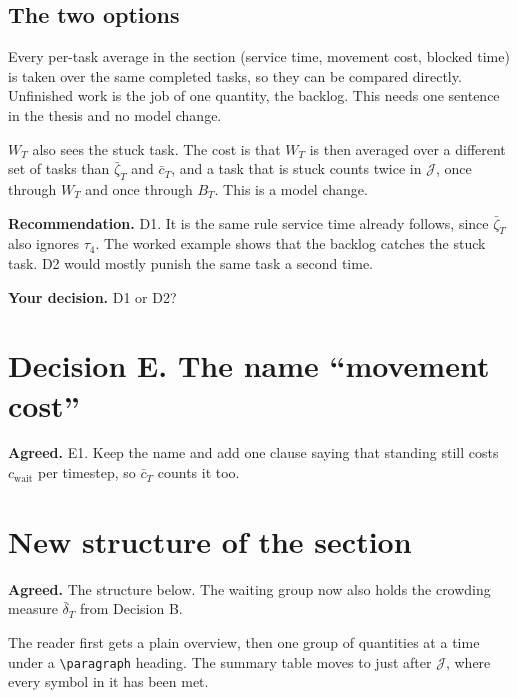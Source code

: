 \documentclass[11pt,a4paper]{article}
\newcommand{\idea}[1]{\par\smallskip\noindent\colorbox{boxbg}{\parbox{\dimexpr\linewidth-2\fboxsep}{\textbf{Recommendation.} #1}}\par\smallskip}
\newcommand{\agreed}[1]{\par\smallskip\noindent\colorbox{okbg}{\parbox{\dimexpr\linewidth-2\fboxsep}{\textbf{Agreed.} #1}}\par\smallskip}
\newcommand{\ask}[1]{\par\smallskip\noindent\colorbox{askbg}{\parbox{\dimexpr\linewidth-2\fboxsep}{\textbf{Your decision.} #1}}\par\smallskip}
\begin{document}
\subsection{The two options}

\begin{description}[leftmargin=1.5em]
  \item[D1. Keep $W_T$ as it is, and say why.] Every per-task average in
    the section (service time, movement cost, blocked time) is taken over
    the same completed tasks, so they can be compared directly. Unfinished
    work is the job of one quantity, the backlog. This needs one sentence
    in the thesis and no model change.
  \item[D2. Count every assigned task.] $W_T$ also sees the stuck task.
    The cost is that $W_T$ is then averaged over a different set of tasks
    than $\bar\zeta_T$ and $\bar c_T$, and a task that is stuck counts
    twice in $\mathcal{J}$, once through $W_T$ and once through $B_T$.
    This is a model change.
\end{description}

\idea{D1. It is the same rule service time already follows, since
$\bar\zeta_T$ also ignores $\tau_4$. The worked example shows that the
backlog catches the stuck task. D2 would mostly punish the same task a
second time.}

\ask{D1 or D2?}

\section{Decision E. The name ``movement cost''}
\label{sec:name}

\agreed{E1. Keep the name and add one clause saying that standing still
costs $c_{\mathrm{wait}}$ per timestep, so $\bar c_T$ counts it too.}

\section{New structure of the section}
\label{sec:structure}

\agreed{The structure below. The waiting group now also holds the crowding
measure $\bar\delta_T$ from Decision B.}

\noindent The reader first gets a plain overview, then one
group of quantities at a time under a \verb|\paragraph| heading. The
summary table moves to just after $\mathcal{J}$, where every symbol in it
has been met.
\end{document}
